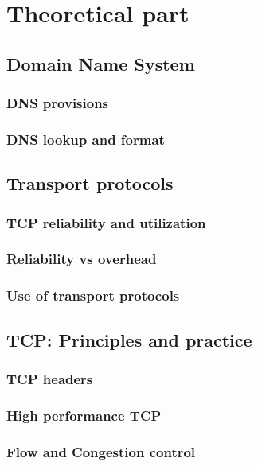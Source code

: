 \section{Theoretical part}

\subsection{Domain Name System}
\subsubsection{DNS provisions}
\subsubsection{DNS lookup and format}

\subsection{Transport protocols}
\subsubsection{TCP reliability and utilization}
\subsubsection{Reliability vs overhead}
\subsubsection{Use of transport protocols}

\subsection{TCP: Principles and practice}
\subsubsection{TCP headers}
\subsubsection{High performance TCP}
\subsubsection{Flow and Congestion control}
